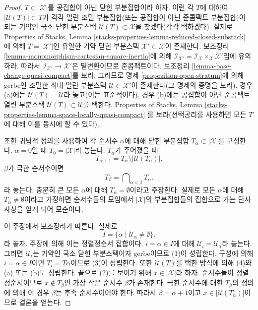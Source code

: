 \begin{proof}
$T \subset |\mathcal{X}|$를 공집합이 아닌 닫힌 부분집합이라 하자. 이런
각 $T$에 대하여 $|\mathcal{U}(T)| \subset T$가 각각 열린 조밀
부분집합(또는 공집합이 아닌 준콤팩트 부분집합)이 되는 기약인 국소 닫힌
부분스택 $\mathcal{U}(T) \subset \mathcal{X}$을 찾겠다(각각 택하겠다).
실제로 Properties of Stacks, Lemma
\ref{stacks-properties-lemma-reduced-closed-substack}
에 의해 $T = |\mathcal{X}'|$인 유일한 기약 닫힌 부분스택
$\mathcal{X}' \subset \mathcal{X}$이 존재한다. 보조정리
\ref{lemma-monomorphism-cartesian-square-inertia}에 의해
$\mathcal{I}_{\mathcal{X}'} =
\mathcal{I}_\mathcal{X} \times_\mathcal{X} \mathcal{X}'$임에 유의하라.
따라서 $\mathcal{I}_{\mathcal{X}'} \to \mathcal{X}'$은 밑변환이므로
준콤팩트이다. 보조정리 \ref{lemma-base-change-quasi-compact}를 보라.
그러므로 명제 \ref{proposition-open-stratum}에 의해 gerbe인 조밀한 최대
열린 부분스택 $\mathcal{U} \subset \mathcal{X}'$이 존재한다(그 명제의
증명을 보라). 경우 (a)에는 $\mathcal{U}(T) = \mathcal{U}$라 놓고(이는
표준적이다), 경우 (b)에는 공집합이 아닌 준콤팩트 열린 부분스택
$\mathcal{U}(T) \subset \mathcal{U}$를 택한다. Properties of Stacks, Lemma
\ref{stacks-properties-lemma-space-locally-quasi-compact}
를 보라(선택공리를 사용하면 모든 $T$에 대해 이를 동시에 할 수 있다).

\medskip\noindent
초한 귀납적 정의를 사용하여 각 순서수 $\alpha$에 대해 닫힌 부분집합
$T_\alpha \subset |\mathcal{X}|$를 구성한다. $\alpha = 0$일 때
$T_0 = |\mathcal{X}|$라 놓는다. $T_\alpha$가 주어졌을 때
$$
T_{\alpha + 1} = T_\alpha \setminus |\mathcal{U}(T_\alpha)|.
$$
$\beta$가 극한 순서수이면
$$
T_\beta = \bigcap\nolimits_{\alpha < \beta} T_\alpha.
$$
라 놓는다. 충분히 큰 모든 $\alpha$에 대해
$T_\alpha = \emptyset$이라고 주장한다. 실제로 모든 $\alpha$에 대해
$T_\alpha \not = \emptyset$이라고 가정하면 순서수들의 모임에서
$|\mathcal{X}|$의 부분집합들의 집합으로 가는 단사 사상을 얻게 되어
모순이다.

\medskip\noindent
이 주장에서 보조정리가 따른다. 실제로
$$
I = \{\alpha \mid \mathcal{U}_\alpha \not = \emptyset \}.
$$
라 놓자. 주장에 의해 이는 정렬정순서 집합이다. $i = \alpha \in I$에
대해 $\mathcal{U}_i = \mathcal{U}_\alpha$라 놓는다. 그러면
$\mathcal{U}_i$는 기약인 국소 닫힌 부분스택이자 gerbe이므로 (1)이
성립한다. 구성에 의해 $i = \alpha \in I$이면
$T_i = T\alpha$이므로 (3)이 성립한다.%
또한 $\mathcal{U}(T)$를 택한 방식에 의해 (4)와 (a) 또는 (b)도 성립한다.
끝으로 (2)를 보이기 위해 $x \in |\mathcal{X}|$라 하자. 순서수들이
정렬정순서이므로 $x \not \in T_\beta$인 가장 작은 순서수 $\beta$가
존재한다. 극한 순서수에 대한 $T_\beta$의 정의에 의해 이 경우 $\beta$는
후속 순서수이어야 한다. 따라서 $\beta = \alpha + 1$이고
$x \in |\mathcal{U}(T_\alpha)|$이므로 결론을 얻는다.
\end{proof}

